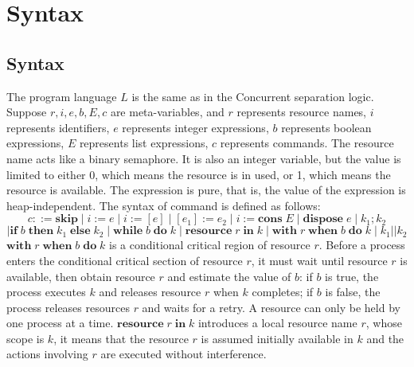 \documentclass{lmcs} %
\theoremstyle{plain}\newtheorem{satz}[thm]{Satz} %
\begin{document}
\section{Syntax}
\subsection*{Syntax}
The program language $L$ is the same as in the Concurrent separation logic\cite{brookes2007semantics}. Suppose $r,i,e,b,E,c$ are
meta-variables, and $r$ represents resource names, $i$ represents identifiers, $e$ represents integer expressions, $b$ represents boolean expressions, $E$ represents list expressions, $c$ represents commands. The resource name acts like a binary semaphore. It is also an integer variable, but the value is limited to either 0, which means the resource is in used, or 1, which means the resource is available. The expression is pure, that is, the value of the expression is heap-independent. The syntax of command is defined as follows:
$$c::=\mathbf{skip}\mid i:=e\mid i:=[e] \mid [e_1]:=e_2\mid i:=\mathbf{cons}\;E \mid \mathbf{dispose}\;e\mid k_1;k_2$$
$$\mid\mathbf{if}\;b\;\mathbf{then}\;k_1\;\mathbf{else}\;k_2\mid\mathbf{while}\;b\;\mathbf{do}\;k\mid\mathbf{resource}\;r\;\mathbf{in}\;k\mid\mathbf{with}\;r\;\mathbf{when}\;b\;\mathbf{do}\;k\mid k_1||k_2$$
$\mathbf{with}\;r\;\mathbf{when}\;b\;\mathbf{do}\;k$ is a conditional critical region of resource $r$. Before a process enters the conditional critical section of resource $r$, it must wait until resource $r$ is available, then obtain resource $r$ and estimate the value of $b$: if $b$ is true, the process executes $k$ and releases resource $r$ when $k$ completes; if $b$ is false, the process releases resources $r$ and waits for a retry. A resource can only be held by one process at a time. $\mathbf{resource}\;r\;\mathbf{in}\;k$ introduces a local resource name $r$, whose scope is $k$, it means that the resource $r$ is assumed initially available in $k$ and the actions involving $r$ are executed without interference.
\end{document}
